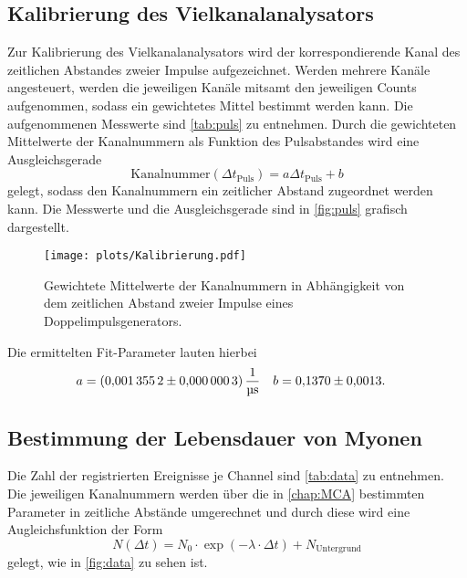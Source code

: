 \subsection{Kalibrierung des Vielkanalanalysators}\label{chap:MCA}
%
Zur Kalibrierung des Vielkanalanalysators wird der korrespondierende Kanal des zeitlichen Abstandes zweier Impulse aufgezeichnet. Werden mehrere Kanäle angesteuert, werden die jeweiligen Kanäle mitsamt den jeweiligen Counts aufgenommen, sodass ein gewichtetes Mittel bestimmt werden kann. Die aufgenommenen Messwerte sind \autoref{tab:puls} zu entnehmen. Durch die gewichteten Mittelwerte der Kanalnummern als Funktion des Pulsabstandes wird eine Ausgleichsgerade
\begin{equation*}
  \mathrm{Kanalnummer} (\Delta t_\mathrm{Puls}) = a \Delta t_\mathrm{Puls} + b
\end{equation*}
gelegt, sodass den Kanalnummern ein zeitlicher Abstand zugeordnet werden kann. Die Messwerte und die Ausgleichsgerade sind in \autoref{fig:puls} grafisch dargestellt.

\begin{figure}[H]
  \centering
  \texttt{[image: plots/Kalibrierung.pdf]}
  \caption{Gewichtete Mittelwerte der Kanalnummern in Abhängigkeit von dem zeitlichen Abstand zweier Impulse eines Doppelimpulsgenerators.}
  \label{fig:puls}
\end{figure}

Die ermittelten Fit-Parameter lauten hierbei
\begin{align*}
  a &= \SI{0.0013552 \pm 0.0000003}{\per\micro\second} & b &= \num{0.137 \pm 0.0013}.
\end{align*}

\subsection{Bestimmung der Lebensdauer von Myonen}

Die Zahl der registrierten Ereignisse je Channel sind \autoref{tab:data} zu entnehmen. Die jeweiligen Kanalnummern werden über die in \autoref{chap:MCA} bestimmten Parameter in zeitliche Abstände umgerechnet und durch diese wird eine Augleichsfunktion der Form
\begin{equation*}
  N(\Delta t) = N_0 \cdot \exp (- \lambda \cdot \Delta t) + N_\mathrm{Untergrund}
\end{equation*}
gelegt, wie in \autoref{fig:data} zu sehen ist.

